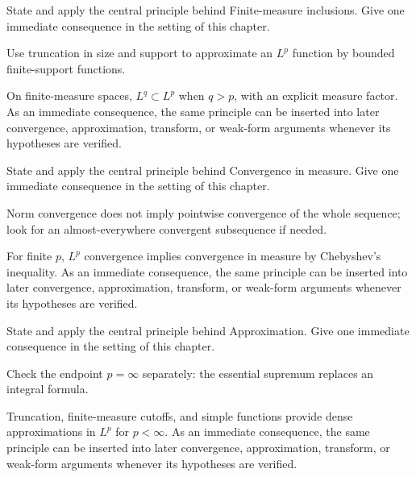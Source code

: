 \begin{exercise}\label{exr:iii06-06}
State and apply the central principle behind Finite-measure inclusions. Give one immediate consequence in the setting of this chapter.
\end{exercise}
\begin{hint}
Use truncation in size and support to approximate an \(L^p\) function by bounded finite-support functions.
\end{hint}
\begin{solution}
On finite-measure spaces, $L^q\subset L^p$ when $q>p$, with an explicit measure factor. As an immediate consequence, the same principle can be inserted into later convergence, approximation, transform, or weak-form arguments whenever its hypotheses are verified.
\end{solution}

\begin{exercise}\label{exr:iii06-07}
State and apply the central principle behind Convergence in measure. Give one immediate consequence in the setting of this chapter.
\end{exercise}
\begin{hint}
Norm convergence does not imply pointwise convergence of the whole sequence; look for an almost-everywhere convergent subsequence if needed.
\end{hint}
\begin{solution}
For finite $p$, $L^p$ convergence implies convergence in measure by Chebyshev's inequality. As an immediate consequence, the same principle can be inserted into later convergence, approximation, transform, or weak-form arguments whenever its hypotheses are verified.
\end{solution}

\begin{exercise}\label{exr:iii06-08}
State and apply the central principle behind Approximation. Give one immediate consequence in the setting of this chapter.
\end{exercise}
\begin{hint}
Check the endpoint \(p=\infty\) separately: the essential supremum replaces an integral formula.
\end{hint}
\begin{solution}
Truncation, finite-measure cutoffs, and simple functions provide dense approximations in $L^p$ for $p<\infty$. As an immediate consequence, the same principle can be inserted into later convergence, approximation, transform, or weak-form arguments whenever its hypotheses are verified.
\end{solution}


